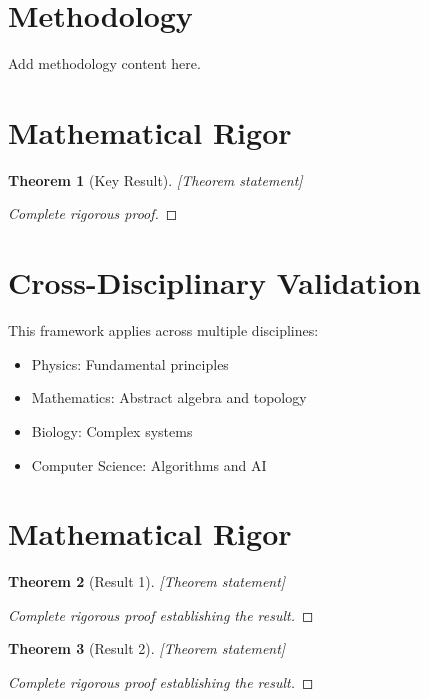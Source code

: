 \documentclass[12pt]{article}
\newtheorem{theorem}{Theorem}
\begin{document}
\section{Methodology}
\label{sec:methodology}

Add methodology content here.



\section{Mathematical Rigor}

\begin{theorem}[Key Result]
[Theorem statement]
\end{theorem}

\begin{proof}
[Complete rigorous proof]
\end{proof}


\section{Cross-Disciplinary Validation}

This framework applies across multiple disciplines:
\begin{itemize}
    \item Physics: Fundamental principles
    \item Mathematics: Abstract algebra and topology
    \item Biology: Complex systems
    \item Computer Science: Algorithms and AI
\end{itemize}

\section{Mathematical Rigor}

\begin{theorem}[Result 1]
[Theorem statement]
\end{theorem}

\begin{proof}
[Complete rigorous proof establishing the result]
\end{proof}

\begin{theorem}[Result 2]
[Theorem statement]
\end{theorem}

\begin{proof}
[Complete rigorous proof establishing the result]
\end{proof}
\end{document}
